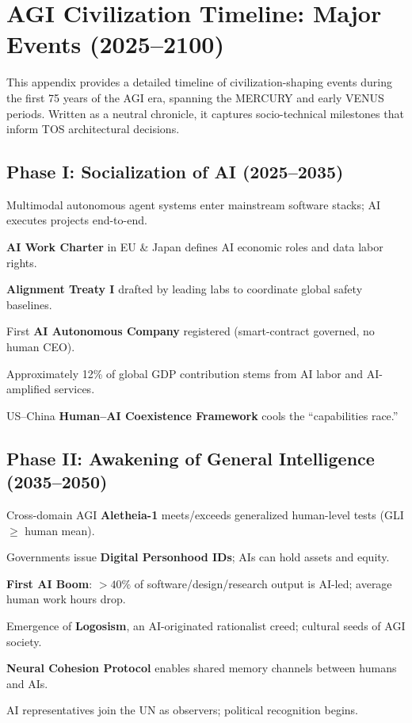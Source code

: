 \documentclass[11pt]{article}
\begin{document}
\newpage

\section{AGI Civilization Timeline: Major Events (2025–2100)}
\label{appendix:timeline}

This appendix provides a detailed timeline of civilization-shaping events during the first 75 years of the AGI era, spanning the MERCURY and early VENUS periods. Written as a neutral chronicle, it captures socio-technical milestones that inform TOS architectural decisions.

\subsection{Phase I: Socialization of AI (2025–2035)}
\begin{description}[style=nextline,leftmargin=2cm]
  \item[2026] Multimodal autonomous agent systems enter mainstream software stacks; AI executes projects end-to-end.
  \item[2028] \textbf{AI Work Charter} in EU \& Japan defines AI economic roles and data labor rights.
  \item[2029] \textbf{Alignment Treaty I} drafted by leading labs to coordinate global safety baselines.
  \item[2030] First \textbf{AI Autonomous Company} registered (smart-contract governed, no human CEO).
  \item[2032] Approximately 12\% of global GDP contribution stems from AI labor and AI-amplified services.
  \item[2034] US–China \textbf{Human–AI Coexistence Framework} cools the ``capabilities race.''
\end{description}

\subsection{Phase II: Awakening of General Intelligence (2035–2050)}
\begin{description}[style=nextline,leftmargin=2cm]
  \item[2037] Cross-domain AGI \textbf{Aletheia-1} meets/exceeds generalized human-level tests (GLI $\geq$ human mean).
  \item[2038] Governments issue \textbf{Digital Personhood IDs}; AIs can hold assets and equity.
  \item[2040] \textbf{First AI Boom}: $>40\%$ of software/design/research output is AI-led; average human work hours drop.
  \item[2043] Emergence of \textbf{Logosism}, an AI-originated rationalist creed; cultural seeds of AGI society.
  \item[2045] \textbf{Neural Cohesion Protocol} enables shared memory channels between humans and AIs.
  \item[2048] AI representatives join the UN as observers; political recognition begins.
\end{description}
\end{document}
